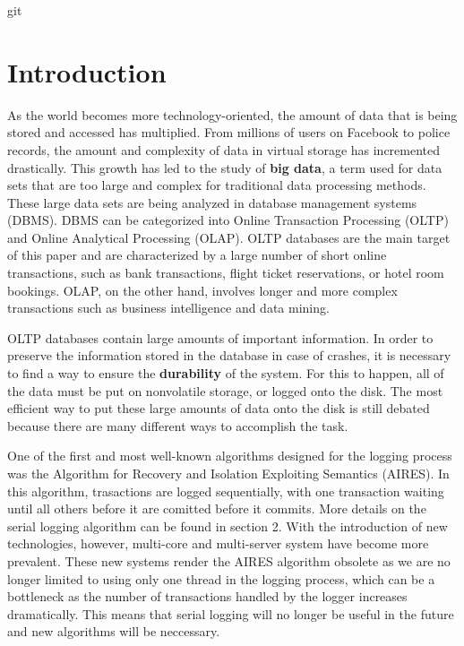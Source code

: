 git \section{Introduction}

As the world becomes more technology-oriented, the amount of data that is being stored and accessed has multiplied. From millions of users on Facebook to police records, the amount and complexity of data in virtual storage has incremented drastically. This growth has led to the study of \textbf{big data}, a term used for data sets that are too large and complex for traditional data processing methods. These large data sets are being analyzed in database management systems (DBMS). DBMS can be categorized into Online Transaction Processing (OLTP) and Online Analytical Processing (OLAP). OLTP databases are the main target of this paper and are characterized by a large number of short online transactions, such as bank transactions, flight ticket reservations, or hotel room bookings. OLAP, on the other hand, involves longer and more complex transactions such as business intelligence and data mining. \newline

OLTP databases contain large amounts of important information. In order to preserve the information stored in the database in case of crashes, it is necessary to find a way to ensure the \textbf{durability} of the system. For this to happen, all of the data must be put on nonvolatile storage, or logged onto the disk. The most efficient way to put these large amounts of data onto the disk is still debated because there are many different ways to accomplish the task. \newline

One of the first and most well-known algorithms designed for the logging process was the Algorithm for Recovery and Isolation Exploiting Semantics (AIRES). In this algorithm, trasactions are logged sequentially, with one transaction waiting until all others before it are comitted before it commits. More details on the serial logging algorithm can be found in section 2. With the introduction of new technologies, however, multi-core and multi-server system have become more prevalent. These new systems render the AIRES algorithm obsolete as we are no longer limited to using only one thread in the logging process, which can be a bottleneck as the number of transactions handled by the logger increases dramatically. This means that serial logging will no longer be useful in the future and new algorithms will be neccessary.  \newline

